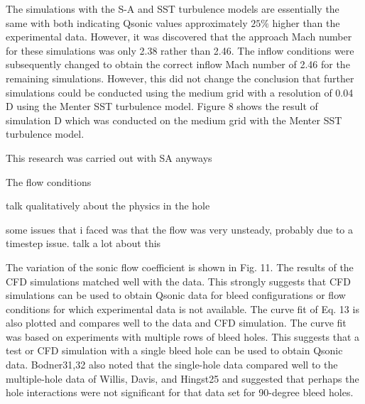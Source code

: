 
The simulations with the S-A and SST turbulence models are essentially the same with both indicating Qsonic values approximately $25\%$ higher than the experimental data. However, it was discovered that the approach Mach number for these simulations was only 2.38 rather than 2.46. The inflow conditions were subsequently changed to obtain the correct inflow Mach number of 2.46 for the remaining simulations. However, this did not change the conclusion that further simulations could be conducted using the medium grid with a resolution of 0.04 D using the Menter SST turbulence model. Figure 8 shows the result of simulation D which was conducted on the medium grid with the Menter SST turbulence model.

This research was carried out with SA anyways

The flow conditions 

talk qualitatively about the physics in the hole

some issues that i faced was that the flow was very unsteady, probably due to a timestep issue. talk a lot about this

The variation of the sonic flow coefficient is shown in Fig. 11. The results of the CFD simulations matched well with the data. This strongly suggests that CFD simulations can be used to obtain Qsonic data for bleed configurations or flow conditions for which experimental data is not available. The curve fit of Eq. 13 is also plotted and compares well to the data and CFD simulation. The curve fit was based on experiments with multiple rows of bleed holes. This suggests that a test or CFD simulation with a single bleed hole can be used to obtain Qsonic data. Bodner31,32 also noted that the single-hole data compared well to the multiple-hole data of Willis, Davis, and Hingst25 and suggested that perhaps the hole interactions were not significant for that data set for 90-degree bleed holes.


